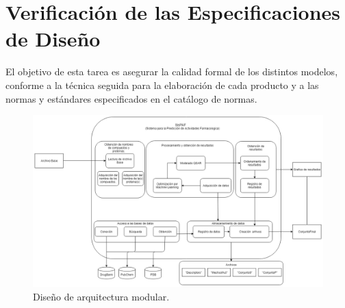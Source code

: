 \section{Verificación de las Especificaciones de Diseño}
\noindent El objetivo de esta tarea es asegurar la calidad formal de los distintos modelos, conforme
a la técnica seguida para la elaboración de cada producto y a las normas y estándares
especificados en el catálogo de normas.

\begin{figure}[H]
    \centering
    \includegraphics[scale=0.35]{Capitulo3/images/7_1.png}
    \caption{Diseño de arquitectura modular.}
    \label{Diagram_4}
\end{figure}
